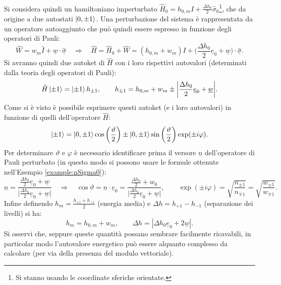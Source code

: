 Si considera quindi un hamiltoniano imperturbato $\hat{H}_0=h_{0,m}\hat{I}+\frac{\Delta h_{0}}{2}\hat{\sigma}_0$\footnote{Si stanno usando le coordinate sferiche orientate.}, che da origine a due autostati $\ket{0,\pm1}$. Una perturbazione del sistema è rappresentata da un operatore autoaggiunto che può quindi essere espresso in funzione degli operatori di Pauli:
\begin{equation*}
    \hat{W}=w_m\hat{I}+\underline{w}\cdot\underline{\hat{\sigma}}\quad\Rightarrow\quad\hat{H}=\hat{H}_0+\hat{W}=(h_{0,m}+w_m)\hat{I}+\bigg(\frac{\Delta h_{0}}{2}\underline{e}_0+\underline{w}\bigg)\cdot\underline{\hat{\sigma}}.
\end{equation*}
Si avranno quindi due autoket di $\hat{H}$ con i loro rispettivi autovalori (determinati dalla teoria degli operatori di Pauli):
\begin{equation*}
    \hat{H}\ket{\pm 1}=\ket{\pm 1}h_{\pm1},\qquad h_{\pm1}=h_{0,m}+w_m\pm\bigg|\frac{\Delta h_{0}}{2}\underline{e}_0+\underline{w}\bigg|.
\end{equation*}
Come si è visto è possibile esprimere questi autoket (e i loro autovalori) in funzione di quelli dell'operatore $\hat{H}$:
\begin{equation*}
    \ket{\pm1}=\ket{0,\pm1}\cos\bigg(\frac{\vartheta}{2}\bigg)\pm\ket{0,\pm1}\sin\bigg(\frac{\vartheta}{2}\bigg)\exp(\pm i\varphi).
\end{equation*}
Per determinare $\vartheta$ e $\varphi$ è necessario identificare prima il versore $\underline{n}$ dell'operatore di Pauli perturbato (in questo modo si possono usare le formule ottenute nell'Esempio \ref{example:nSigma0}):
\begin{equation*}
    \underline{n}=\frac{\frac{\Delta h_{0}}{2}\underline{e}_0+\underline{w}}{\bigg|\frac{\Delta h_{0}}{2}\underline{e}_0+\underline{w}\bigg|} \quad \Rightarrow\quad \cos\vartheta=\underline{n}\cdot\underline{e}_0=\frac{\frac{\Delta h_{0}}{2}+w_0}{\bigg|\frac{\Delta h_{0}}{2}\underline{e}_0+\underline{w}\bigg|},\qquad \exp(\pm i \varphi)=\sqrt{\frac{n_{\pm1}}{n_{\mp1}}}=\sqrt{\frac{w_{\pm1}}{w_{\mp1}}}.
\end{equation*}
Infine definendo $h_{m}=\frac{h_{+1}+h_{-1}}{2}$ (energia media) e $\Delta{h}=h_{+1}-h_{-1}$ (separazione dei livelli) si ha:
\begin{equation*}
    h_m=h_{0,m}+w_m,\qquad\Delta{h}=|\Delta h_0\underline{e}_0+2\underline{w}|.
\end{equation*}
Si osservi che, seppure queste quantità possano sembrare facilmente ricavabili, in particolar modo l'autovalore energetico può essere alquanto complesso da calcolare (per via della presenza del modulo vettoriale).
